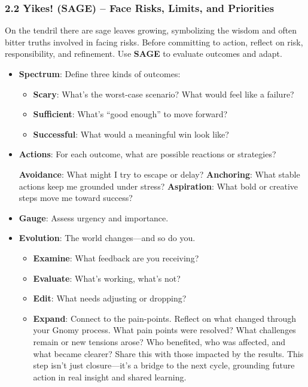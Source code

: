 \documentclass{article}
\begin{document}
\subsubsection{2.2 Yikes! (SAGE) – Face Risks, Limits, and Priorities}
On the tendril there are sage leaves growing, symbolizing the wisdom and often bitter truths involved in facing risks. Before committing to action, reflect on risk, responsibility, and refinement. Use \textbf{SAGE} to evaluate outcomes and adapt.
\begin{itemize}[noitemsep,topsep=0pt]
    \item \textbf{Spectrum}: Define three kinds of outcomes:
    \begin{itemize}[noitemsep,topsep=0pt]
        \item \textbf{Scary}: What's the worst-case scenario? What would feel like a failure?
        \item \textbf{Sufficient}: What's ``good enough'' to move forward?
        \item \textbf{Successful}: What would a meaningful win look like?
    \end{itemize}
    \item \textbf{Actions}: For each outcome, what are possible reactions or strategies?
    \begin{itemize}[noitemsep,topsep=0pt]
        \textbf{Avoidance}: What might I try to escape or delay?
        \textbf{Anchoring}: What stable actions keep me grounded under stress?
        \textbf{Aspiration}: What bold or creative steps move me toward success?
    \end{itemize}
    \item \textbf{Gauge}: Assess urgency and importance.
    \item \textbf{Evolution}: The world changes—and so do you.
    \begin{itemize}[noitemsep,topsep=0pt]
        \item \textbf{Examine}: What feedback are you receiving?
        \item \textbf{Evaluate}: What's working, what's not?
        \item \textbf{Edit}: What needs adjusting or dropping?
        \item \textbf{Expand}: Connect to the pain-points. Reflect on what changed through your Gnomy process. What pain points were resolved? What challenges remain or new tensions arose? Who benefited, who was affected, and what became clearer? Share this with those impacted by the results. This step isn't just closure—it's a bridge to the next cycle, grounding future action in real insight and shared learning.
    \end{itemize}
\end{itemize}
\end{document}
